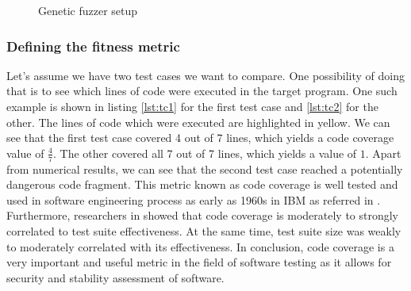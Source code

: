 \begin{figure}[h!]
    \centering


    \caption{Genetic fuzzer setup}
    \label{fig:genetic_fuzz}
\end{figure}

\subsubsection{Defining the fitness metric}
Let's assume we have two test cases we want to compare. One possibility of doing that is to see which lines of code were executed in the target program. One such example is shown in listing \ref{lst:tc1} for the first test case and \ref{lst:tc2} for the other. The lines of code which were executed are highlighted in yellow. We can see that the first test case covered 4 out of 7 lines, which yields a code coverage value of $\frac{4}{7}$. The other covered all 7 out of 7 lines, which yields a value of $1$. Apart from numerical results, we can see that the second test case reached a potentially dangerous code fragment. This metric known as code coverage is well tested and used in software engineering process as early as 1960s in IBM as referred in \cite{ibm_coverage}. Furthermore, researchers in \cite{coverage} showed that code coverage is moderately to strongly correlated to test suite effectiveness. At the same time, test suite size was weakly to moderately correlated with its effectiveness. In conclusion, code coverage is a very important and useful metric in the field of software testing as it allows for security and stability assessment of software.

